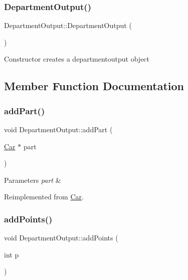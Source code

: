 \subsubsection{\texorpdfstring{Department\+Output()}{DepartmentOutput()}}
{\footnotesize\ttfamily Department\+Output\+::\+Department\+Output (\begin{DoxyParamCaption}{ }\end{DoxyParamCaption})}

Constructor creates a departmentoutput object 

\subsection{Member Function Documentation}
\mbox{\label{classDepartmentOutput_a8b39539ad1ca3d8026d53dd5ab88be97}} 
\subsubsection{\texorpdfstring{add\+Part()}{addPart()}}
{\footnotesize\ttfamily void Department\+Output\+::add\+Part (\begin{DoxyParamCaption}\item[{\hyperlink{classCar}{Car} $\ast$}]{part }\end{DoxyParamCaption})\hspace{0.3cm}{\ttfamily [virtual]}}


\begin{DoxyParams}{Parameters}
{\em part} & \\
\hline
\end{DoxyParams}


Reimplemented from \hyperlink{classCar_a97c6c4d86fd756e496871bda0651c5c6}{Car}.

\mbox{\label{classDepartmentOutput_a6ce74748aa402298902e378ff47c1e49}} 
\subsubsection{\texorpdfstring{add\+Points()}{addPoints()}}
{\footnotesize\ttfamily void Department\+Output\+::add\+Points (\begin{DoxyParamCaption}\item[{int}]{p }\end{DoxyParamCaption})\hspace{0.3cm}{\ttfamily [virtual]}}


